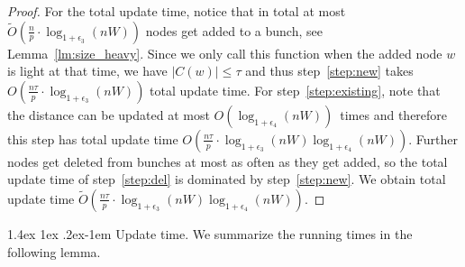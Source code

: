 \documentclass[11pt]{article}
\makeatletter
\theoremstyle{definition}
\theoremstyle{remark}
\renewcommand{\paragraph}{%
  \@startsection{paragraph}{4}%
  {\z@}{1.4ex \@plus 1ex \@minus .2ex}{-1em}%
  {\normalfont\normalsize\bfseries}%
}
\makeatother
\begin{document}
\begin{proof}
    For the total update time, notice that in total at most $\tilde O(\tfrac{n}{p}\cdot \log_{1+\epsilon_3}(nW))$ nodes get added to a bunch, see Lemma~\ref{lm:size_heavy}. Since we only call this function when the added node $w$ is light at that time, we have $|C(w)|\leq \tau$ and thus step~\ref{step:new} takes $O(\tfrac{n\tau}{p}\cdot \log_{1+\epsilon_3}(nW))$ total update time. For step~\ref{step:existing}, note that the distance can be updated at most $O(\log_{1+\epsilon_4}(nW))$~times and therefore this step has total update time $O(\tfrac{n\tau}{p}\cdot \log_{1+\epsilon_3}(nW)\log_{1+\epsilon_4}(nW))$. Further nodes get deleted from bunches at most as often as they get added, so the total update time of step~\ref{step:del} is dominated by step~\ref{step:new}. We obtain total update time $\tilde O ( \tfrac{n\tau }{p} \cdot \log_{1+\epsilon_3}(nW)\log_{1+\epsilon_4}(nW)) $.
\end{proof}

\paragraph{Update time.}
We summarize the running times in the following lemma. 
\end{document}
